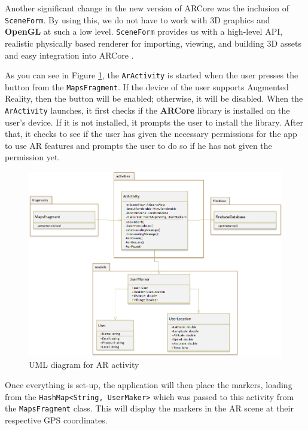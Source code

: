 Another significant change in the new version of ARCore was the inclusion of \texttt{SceneForm}. By using this, we do not have to work with 3D graphics and \textbf{OpenGL} at such a low level. \texttt{SceneForm} provides us with a high-level API, realistic physically based renderer for importing, viewing, and building 3D assets and easy integration into ARCore \cite{ARCoreSceneForm2018}.

As you can see in Figure \ref{fig:uml-ar}, the \texttt{ArActivity} is started when the user presses the button from the \texttt{MapsFragment}. If the device of the user supports Augmented Reality, then the button will be enabled; otherwise, it will be disabled. When the \texttt{ArActivity} launches, it first checks if the \textbf{ARCore} library is installed on the user's device. If it is not installed, it prompts the user to install the library. After that, it checks to see if the user has given the necessary permissions for the app to use AR features and prompts the user to do so if he has not given the permission yet.

\begin{figure}
    \centering
        \includegraphics[width=1.00\textwidth]{images/uml-ar.png}
    \caption{UML diagram for AR activity}
    \label{fig:uml-ar}
\end{figure}

Once everything is set-up, the application will then place the markers, loading from the \texttt{HashMap<String, UserMaker>} which was passed to this activity from the \texttt{MapsFragment} class. This will display the markers in the AR scene at their respective GPS coordinates.

